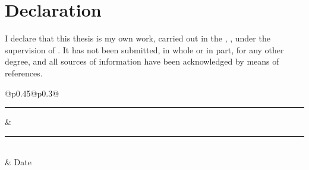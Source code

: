 \chapter*{Declaration}

I declare that this thesis is my own work, carried out in the \ThesisDepartment,
\ThesisUniversity, under the supervision of \ThesisSupervisor. It has not been
submitted, in whole or in part, for any other degree, and all sources of
information have been acknowledged by means of references.

\vspace{3cm}
\noindent
\begin{tabular}{@{}p{0.45\textwidth}@{\hspace{0.1\textwidth}}p{0.3\textwidth}@{}}
  \rule{\linewidth}{0.4pt} & \rule{\linewidth}{0.4pt} \\
  \ThesisAuthor            & Date \\
\end{tabular}
